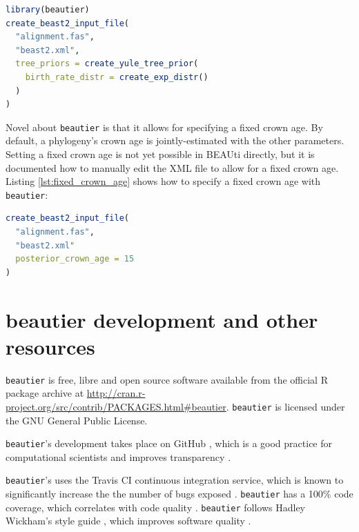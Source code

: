 \documentclass{article}
\begin{document}
\begin{lstlisting}[language=R, caption=Example with Yule tree prior with different birth rate distribution, label=lst:diff_distr, floatplacement=H]
library(beautier)
create_beast2_input_file(
  "alignment.fas",
  "beast2.xml",
  tree_priors = create_yule_tree_prior(
    birth_rate_distr = create_exp_distr()    
  )
)
\end{lstlisting}

Novel about \verb;beautier; is that it allows for specifying a fixed crown age. 
By default, a phylogeny's crown age is jointly-estimated with the other parameters.
Setting a fixed crown age is not yet possible in BEAUti directly, but it is documented how to 
manually edit the XML file to allow for a fixed crown age. 
Listing \ref{lst:fixed_crown_age} shows how to specify a fixed crown age with \verb;beautier;:

\begin{lstlisting}[language=R, caption=Example with fixed crown age, label=lst:fixed_crown_age, floatplacement=H]
create_beast2_input_file(
  "alignment.fas",
  "beast2.xml"
  posterior_crown_age = 15
)
\end{lstlisting}

\section{beautier development and other resources}

\verb;beautier; is free, libre and open source software available from the official R package archive at 
\url{http://cran.r-project.org/src/contrib/PACKAGES.html\#beautier}.  
\verb;beautier; is licensed under the GNU General Public License.

\verb;beautier;'s development takes place on GitHub \cite{github}, 
which is a good practice for computational scientists \cite{perez2016ten} 
and improves transparency \cite{gorgolewski2016practical}.

\verb;beautier;'s uses the Travis CI \cite{travis} 
continuous integration service, which is known to significantly 
increase the the number of bugs exposed \cite{vasilescu2015}.
\verb;beautier; has a 100\% code coverage, which correlates with code quality \cite{horgan1994,del1995correlation}. 
\verb;beautier; follows Hadley Wickham's style guide \cite{style_guide}, which improves software quality \cite{fang2001}.
\end{document}
